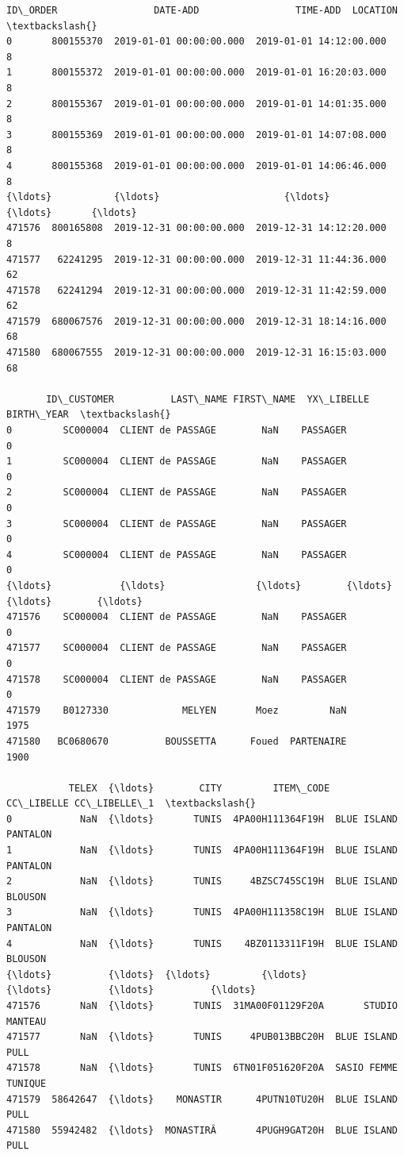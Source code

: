 \documentclass[11pt]{article}
\makeatletter
\newcommand{\boxspacing}{\kern\kvtcb@left@rule\kern\kvtcb@boxsep}
\newcommand{\prompt}[4]{
        \ttfamily\llap{{\color{#2}[#3]:\hspace{3pt}#4}}\vspace{-\baselineskip}
    }
\makeatother
\begin{document}
            \begin{tcolorbox}[breakable, size=fbox, boxrule=.5pt, pad at break*=1mm, opacityfill=0]
\prompt{Out}{outcolor}{2}{\boxspacing}
\begin{Verbatim}[commandchars=\\\{\}]
         ID\_ORDER                 DATE-ADD                 TIME-ADD  LOCATION  \textbackslash{}
0       800155370  2019-01-01 00:00:00.000  2019-01-01 14:12:00.000         8
1       800155372  2019-01-01 00:00:00.000  2019-01-01 16:20:03.000         8
2       800155367  2019-01-01 00:00:00.000  2019-01-01 14:01:35.000         8
3       800155369  2019-01-01 00:00:00.000  2019-01-01 14:07:08.000         8
4       800155368  2019-01-01 00:00:00.000  2019-01-01 14:06:46.000         8
{\ldots}           {\ldots}                      {\ldots}                      {\ldots}       {\ldots}
471576  800165808  2019-12-31 00:00:00.000  2019-12-31 14:12:20.000         8
471577   62241295  2019-12-31 00:00:00.000  2019-12-31 11:44:36.000        62
471578   62241294  2019-12-31 00:00:00.000  2019-12-31 11:42:59.000        62
471579  680067576  2019-12-31 00:00:00.000  2019-12-31 18:14:16.000        68
471580  680067555  2019-12-31 00:00:00.000  2019-12-31 16:15:03.000        68

       ID\_CUSTOMER          LAST\_NAME FIRST\_NAME  YX\_LIBELLE BIRTH\_YEAR  \textbackslash{}
0         SC000004  CLIENT de PASSAGE        NaN    PASSAGER          0
1         SC000004  CLIENT de PASSAGE        NaN    PASSAGER          0
2         SC000004  CLIENT de PASSAGE        NaN    PASSAGER          0
3         SC000004  CLIENT de PASSAGE        NaN    PASSAGER          0
4         SC000004  CLIENT de PASSAGE        NaN    PASSAGER          0
{\ldots}            {\ldots}                {\ldots}        {\ldots}         {\ldots}        {\ldots}
471576    SC000004  CLIENT de PASSAGE        NaN    PASSAGER          0
471577    SC000004  CLIENT de PASSAGE        NaN    PASSAGER          0
471578    SC000004  CLIENT de PASSAGE        NaN    PASSAGER          0
471579    B0127330             MELYEN       Moez         NaN       1975
471580   BC0680670          BOUSSETTA      Foued  PARTENAIRE       1900

           TELEX  {\ldots}        CITY         ITEM\_CODE   CC\_LIBELLE CC\_LIBELLE\_1  \textbackslash{}
0            NaN  {\ldots}       TUNIS  4PA00H111364F19H  BLUE ISLAND     PANTALON
1            NaN  {\ldots}       TUNIS  4PA00H111364F19H  BLUE ISLAND     PANTALON
2            NaN  {\ldots}       TUNIS     4BZSC745SC19H  BLUE ISLAND      BLOUSON
3            NaN  {\ldots}       TUNIS  4PA00H111358C19H  BLUE ISLAND     PANTALON
4            NaN  {\ldots}       TUNIS    4BZ0113311F19H  BLUE ISLAND      BLOUSON
{\ldots}          {\ldots}  {\ldots}         {\ldots}               {\ldots}          {\ldots}          {\ldots}
471576       NaN  {\ldots}       TUNIS  31MA00F01129F20A       STUDIO      MANTEAU
471577       NaN  {\ldots}       TUNIS     4PUB013BBC20H  BLUE ISLAND         PULL
471578       NaN  {\ldots}       TUNIS  6TN01F051620F20A  SASIO FEMME      TUNIQUE
471579  58642647  {\ldots}    MONASTIR      4PUTN10TU20H  BLUE ISLAND         PULL
471580  55942482  {\ldots}  MONASTIRÂ       4PUGH9GAT20H  BLUE ISLAND         PULL


\end{Verbatim}
\end{tcolorbox}
\end{document}
